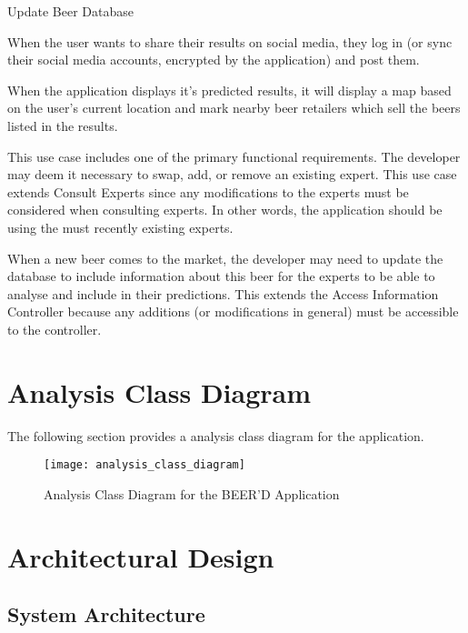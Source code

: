 \documentclass[]{article}
\begin{document}
\begin{labeling}{Update Beer Database}
\item [Share on Social Media] When the user wants to share their results on social media, they log in (or sync their social media accounts, encrypted by the application) and post them.
\item [Open Nearby Locations] When the application displays it's predicted results, it will display a map based on the user's current location and mark nearby beer retailers which sell the beers listed in the results.
\item [Edit Expert] This use case includes one of the primary functional requirements. The developer may deem it necessary to swap, add, or remove an existing expert. This use case extends Consult Experts since any modifications to the experts must be considered when consulting experts. In other words, the application should be using the must recently existing experts.
\item [Update Beer Database] When a new beer comes to the market, the developer may need to update the database to include information about this beer for the experts to be able to analyse and include in their predictions. This extends the Access Information Controller because any additions (or modifications in general) must be accessible to the controller. 
\end{labeling}

\newpage
\section{Analysis Class Diagram}
\label{sec:analysis_class_diagram}
The following section provides a analysis class diagram for the application. \\
\begin{figure}[!ht]
\texttt{[image: analysis\_class\_diagram]}
\caption{Analysis Class Diagram for the BEER'D Application}
\end{figure}



\section{Architectural Design}
\label{sec:architectural_design}

\subsection{System Architecture}
\label{sub:system_architecture}
\end{document}
